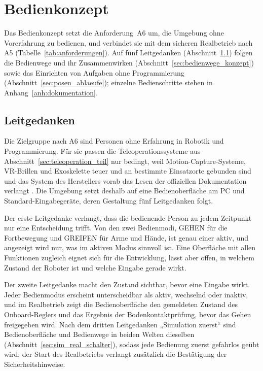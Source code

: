 \section{Bedienkonzept}
\label{sec:bedienkonzept}
Das Bedienkonzept setzt die Anforderung~A6 um, die Umgebung ohne Vorerfahrung zu bedienen, und verbindet sie mit
dem sicheren Realbetrieb nach A5 (Tabelle~\ref{tab:anforderungen}).
Auf fünf Leitgedanken (Abschnitt~\ref{sec:leitgedanken}) folgen die Bedienwege und ihr Zusammenwirken
(Abschnitt~\ref{sec:bedienwege_konzept}) sowie das Einrichten von Aufgaben ohne Programmierung
(Abschnitt~\ref{sec:posen_ablaeufe}); einzelne Bedienschritte stehen in Anhang~\ref{anh:dokumentation}.

\subsection{Leitgedanken}
\label{sec:leitgedanken}
Die Zielgruppe nach A6 sind Personen ohne Erfahrung in Robotik und Programmierung.
Für sie passen die Teleoperationssysteme aus Abschnitt~\ref{sec:teleoperation_teil} nur bedingt, weil
Motion-Capture-Systeme, VR-Brillen und Exoskelette teuer und an bestimmte Einsatzorte gebunden sind
\cite{Fu2024} und das System des Herstellers vorab das Lesen der offiziellen Dokumentation verlangt
\cite{UnitreeXRTeleop}.
Die Umgebung setzt deshalb auf eine Bedienoberfläche am PC und Standard-Eingabegeräte, deren Gestaltung fünf
Leitgedanken folgt.

Der erste Leitgedanke verlangt, dass die bedienende Person zu jedem Zeitpunkt nur eine Entscheidung trifft.
Von den zwei Bedienmodi, GEHEN für die Fortbewegung und GREIFEN für Arme und Hände, ist genau einer aktiv, und
angezeigt wird nur, was im aktiven Modus sinnvoll ist.
Eine Oberfläche mit allen Funktionen zugleich eignet sich für die Entwicklung, lässt aber offen, in welchem Zustand
der Roboter ist und welche Eingabe gerade wirkt.

Der zweite Leitgedanke macht den Zustand sichtbar, bevor eine Eingabe wirkt.
Jeder Bedienmodus erscheint unterscheidbar als aktiv, wechselnd oder inaktiv, und im Realbetrieb zeigt die
Bedienoberfläche den gemeldeten Zustand des Onboard-Reglers und das Ergebnis der Bodenkontaktprüfung, bevor das
Gehen freigegeben wird.
Nach dem dritten Leitgedanken „Simulation zuerst“ sind Bedienoberfläche und Bedienwege in beiden Welten dieselben
(Abschnitt~\ref{sec:sim_real_schalter}), sodass jede Bedienung zuerst gefahrlos geübt wird; der Start des
Realbetriebs verlangt zusätzlich die Bestätigung der Sicherheitshinweise.

